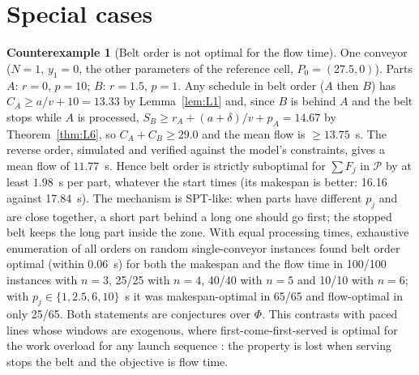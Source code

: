 \documentclass[11pt,a4paper]{article}
\theoremstyle{plain}
\theoremstyle{definition}
\newtheorem{counterexample}{Counterexample}
\theoremstyle{remark}
\newcommand{\Pb}{\mathcal{P}}
\begin{document}
\section{Special cases}\label{app:special}
\begin{counterexample}[Belt order is not optimal for the flow time]\label{cex:single}
One conveyor ($N=1$, $y_1=0$, the other parameters of the reference cell,
$P_0=(27.5,0)$). Parts $A$: $r=0$, $p=10$; $B$: $r=1.5$, $p=1$. Any schedule in belt order
($A$ then $B$) has $C_A\ge a/v+10=13.33$ by Lemma~\ref{lem:L1} and, since $B$ is behind $A$
and the belt stops while $A$ is processed, $S_B\ge r_A+(a+\delta)/v+p_A=14.67$ by
Theorem~\ref{thm:L6}, so $C_A+C_B\ge29.0$ and the mean flow is $\ge13.75$~s. The reverse
order, simulated and verified against the model's constraints, gives a mean flow of
$11.77$~s. Hence belt order is strictly suboptimal for $\sum F_j$ in $\Pb$ by at least
$1.98$~s per part, whatever the start times (its makespan is better: 16.16 against
17.84~s). The mechanism is SPT-like: when parts have different $p_j$ and are close
together, a short part behind a long one should go first; the stopped belt keeps the long
part inside the zone. With equal processing times, exhaustive enumeration of all orders
on random single-conveyor instances found belt order optimal (within 0.06~s) for both the
makespan and the flow time in 100/100 instances with $n=3$, 25/25 with $n=4$, 40/40 with
$n=5$ and 10/10 with $n=6$; with $p_j\in\{1,2.5,6,10\}$~s it was makespan-optimal in 65/65
and flow-optimal in only 25/65. Both statements are conjectures over $\Phi$. This contrasts with
paced lines whose windows are exogenous, where first-come-first-served is optimal for the
work overload for any launch sequence \cite{Yano1991}: the property is lost when serving
stops the belt and the objective is flow time.
\end{counterexample}
\end{document}
